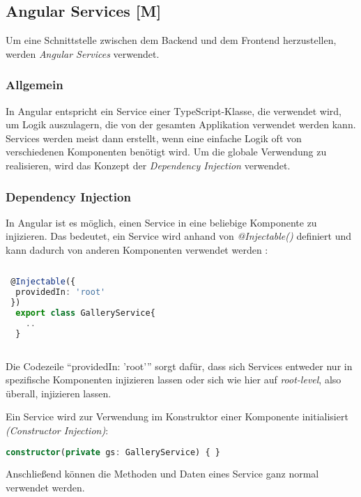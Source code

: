\subsection{Angular Services [M]}
\label{txt:sec:Services}

Um eine Schnittstelle zwischen dem Backend und dem Frontend herzustellen, werden \emph{Angular Services} verwendet.

\subsubsection{Allgemein}
In Angular entspricht ein Service einer TypeScript-Klasse, die verwendet wird, um Logik auszulagern, die von der gesamten Applikation verwendet werden kann. Services werden meist dann erstellt, wenn eine einfache Logik oft von verschiedenen Komponenten benötigt wird. Um die globale Verwendung zu realisieren, wird das Konzept der \emph{Dependency Injection} verwendet. \cite{AngularBuch} \cite{AngularArchitectureService}

\subsubsection{Dependency Injection}
\label{DPI}
In Angular ist es möglich, einen Service in eine beliebige Komponente zu injizieren. Das bedeutet, ein Service wird anhand von \emph{@Injectable()} definiert und kann dadurch von anderen Komponenten verwendet werden \cite{AngularBuch}:

\begin{lstlisting}[caption={Eine Klasse Injectable machen},  language=TypeScript,label=lst:impl:injectable]   
    
 @Injectable({
  providedIn: 'root'
 })
  export class GalleryService{
    ..
  }
   
\end{lstlisting}

Die Codezeile “providedIn: 'root'” sorgt dafür, dass sich Services entweder nur in spezifische Komponenten injizieren lassen oder sich wie hier auf \emph{root-level}, also überall, injizieren lassen. \cite{AngularBuch}

Ein Service wird zur Verwendung im Konstruktor einer Komponente initialisiert \emph{(Constructor Injection)}: 

\begin{lstlisting}[caption={Constructor Injection},  language=TypeScript,label=lst:impl:concstructorinjection]   
    constructor(private gs: GalleryService) { }
\end{lstlisting}
Anschließend können die Methoden und Daten eines Service ganz normal verwendet werden.


